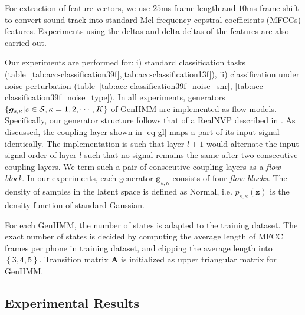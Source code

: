 \documentclass[letterpaper]{article} %
\begin{document}
For extraction of feature vectors, we use $25$ms frame length and $10$ms frame shift to convert sound track into standard Mel-frequency cepstral coefficients (MFCCs) features. Experiments using the deltas and delta-deltas of the features are also carried out.


Our experiments are performed for: i) standard classification tasks (table~\ref{tab:acc-classification39f},\ref{tab:acc-classification13f}), ii) classification under noise perturbation (table~\ref{tab:acc-classification39f_noise_snr}, \ref{tab:acc-classification39f_noise_type}).
In all experiments, generators $\left\{\bm{g}_{s,\kappa}|s\in \mathcal{S}, \kappa=1, 2, \cdots, K \right\}$ of GenHMM are implemented as flow models. Specifically, our generator structure follows that of a RealNVP described in \cite{2016arXiv160508803D}.
As discussed, the coupling layer shown in \eqref{eq-gl} maps a part of its input signal identically.
The implementation is such that layer $l+1$ would alternate the input signal order of layer $l$ such that no signal remains the same after two consecutive coupling layers.
We term such a pair of consecutive coupling layers as a \textit{flow block}.
In our experiments, each generator $\bm{g}_{s,\kappa}$ consists of four \textit{flow blocks}.
The density of samples in the latent space is defined as Normal, i.e. $p_{s,\kappa}(\bm{z})$ is the density function of standard Gaussian.

For each GenHMM, the number of states is adapted to the training dataset.
The exact number of states is decided by computing the average length of MFCC frames per phone in training dataset, and clipping the average length into $\left\{ 3,4,5 \right\}$.
Transition matrix $\bm{A}$ is initialized as upper triangular matrix for GenHMM.

\subsection{Experimental Results}
\end{document}
